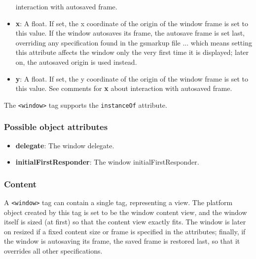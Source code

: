 \begin{itemize}
  interaction with autosaved frame.
\item {\bf x}: A float.  If set, the x coordinate of the origin of the
  window frame is set to this value.  If the window autosaves its
  frame, the autosave frame is set last, overriding any specification
  found in the gsmarkup file ... which means setting this attribute
  affects the window only the very first time it is displayed; later
  on, the autosaved origin is used instead.
\item {\bf y}: A float.  If set, the y coordinate of the origin of the
  window frame is set to this value.  See comments for {\bf x} about
  interaction with autosaved frame.
\end{itemize}

The \texttt{<window>} tag supports the \texttt{instanceOf} attribute.

\subsubsection{Possible object attributes}
\begin{itemize}
\item {\bf delegate}: The window delegate.
\item {\bf initialFirstResponder}: The window initialFirstResponder.
\end{itemize}

\subsubsection{Content}
A \texttt{<window>} tag can contain a single tag, representing a view.
The platform object created by this tag is set to be the window
content view, and the window itself is sized (at first) so that the
content view exactly fits.  The window is later on resized if a fixed
content size or frame is specified in the attributes; finally, if the
window is autosaving its frame, the saved frame is restored last, so
that it overrides all other specifications.

